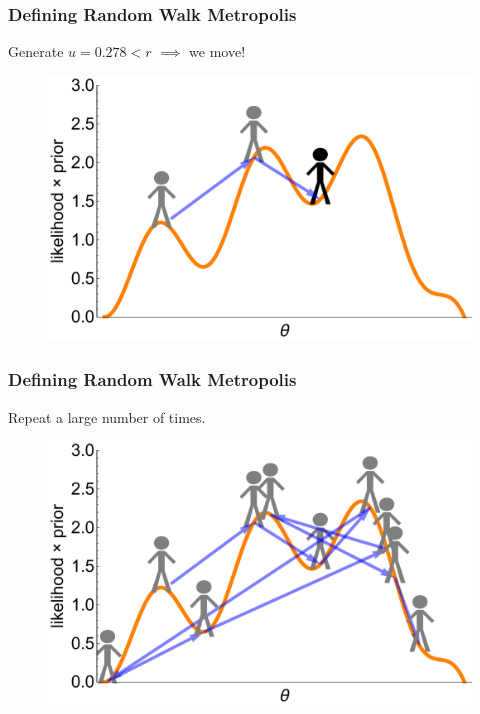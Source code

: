\documentclass[handout]{beamer}
\begin{document}
\begin{frame}
\frametitle{Defining Random Walk Metropolis}
Generate $u = 0.278 < r$ $\implies$ we move! 

\begin{figure}[ht]
\centerline{\includegraphics[width=1\textwidth]{animations_figures/lec4_metropolisDefinition13.pdf}}
\end{figure}

\end{frame}

\begin{frame}
\frametitle{Defining Random Walk Metropolis}
Repeat a large number of times.

\begin{figure}[ht]
\centerline{\includegraphics[width=1\textwidth]{animations_figures/lec4_metropolisDefinitionFinal.pdf}}
\end{figure}

\end{frame}
\end{document}
